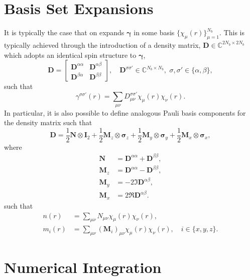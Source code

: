 \documentclass[11pt]{article}
\newcommand{\opdm}[0]{\boldsymbol{\gamma}}
\newcommand{\pauli}[1]{\boldsymbol{\sigma}_{#1}}
\begin{document}
\section{Basis Set Expansions}

It is typically the case that on expands $\opdm$ in some basis $\{\chi_\mu(r)\}_{\mu = 1}^{N_b}$. This is typically achieved 
through the introduction of a density matrix, $\mathbf{D} \in \mathbb{C}^{2N_b\times 2N_b}$ which adopts an identical
spin structure to $\opdm$,
\begin{equation}
\mathbf{D} = \begin{bmatrix} 
  \mathbf{D}^{\alpha\alpha} & \mathbf{D}^{\alpha\beta} \\ 
  \mathbf{D}^{\beta\alpha} & \mathbf{D}^{\beta\beta} 
\end{bmatrix}, \quad
\mathbf{D}^{\sigma\sigma'} \in \mathbb{C}^{N_b\times N_b},\,\, \sigma,\sigma'\in\{\alpha,\beta\},
\end{equation}
such that
\begin{equation}
\gamma^{\sigma\sigma'}(r) = \sum_{\mu\nu} D_{\mu\nu}^{\sigma\sigma'} \chi_\mu(r) \chi_\nu(r).
\end{equation}
In particular, it is also possible to define analogous Pauli basis components for the density matrix
such that
\begin{equation}
\mathbf{D} = \frac{1}{2}\mathbf{N} \otimes \mathbf{I}_2 + 
\frac{1}{2}\mathbf{M}_z \otimes \pauli{z} + 
\frac{1}{2}\mathbf{M}_y \otimes \pauli{y} + 
\frac{1}{2}\mathbf{M}_x \otimes \pauli{x}, 
\end{equation}
where
\begin{align}
\mathbf{N}   &= \mathbf{D}^{\alpha\alpha} + \mathbf{D}^{\beta\beta},    \\ 
\mathbf{M}_z &= \mathbf{D}^{\alpha\alpha} - \mathbf{D}^{\beta\beta},    \\
\mathbf{M}_y &= -2\Im \mathbf{D}^{\alpha\beta}, \\
\mathbf{M}_x &= 2\Re \mathbf{D}^{\alpha\beta}.
\end{align}
such that
\begin{align}
n(r)   &= \sum_{\mu\nu} N_{\mu\nu} \chi_\mu(r) \chi_\nu(r), \\
m_i(r) &= \sum_{\mu\nu} (\mathbf{M}_i)_{\mu\nu} \chi_\mu(r) \chi_\nu(r), \quad i \in \{x,y,z\}. 
\end{align}

\section{Numerical Integration}
\end{document}
